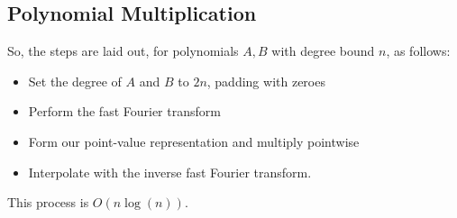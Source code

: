 \documentclass[a4paper, 12pt, twoside]{article}
\begin{document}
\subsection{Polynomial Multiplication}

So, the steps are laid out, for polynomials $A, B$ with degree bound 
$n$, as follows: \begin{itemize}
  \item Set the degree of $A$ and $B$ to $2n$, padding with zeroes
  \item Perform the fast Fourier transform
  \item Form our point-value representation and multiply pointwise
  \item Interpolate with the inverse fast Fourier transform.
\end{itemize} This process is $O(n \log(n))$.
\end{document}
